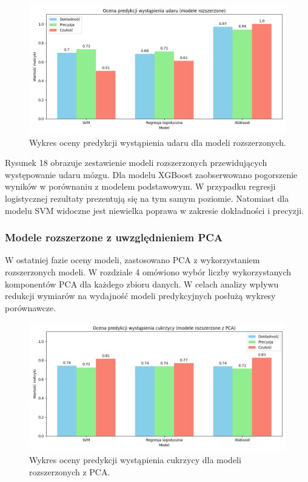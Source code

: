 \documentclass[onecolumn,12pt]{article}
\begin{document}
\begin{figure}[H]
    \centering
    \includegraphics[width=0.90\linewidth]{raport/graphs/udar_po.png}
    \captionsetup{justification=centering}
    \caption{Wykres oceny predykcji wystąpienia udaru dla modeli rozszerzonych.}
\end{figure}

\noindent
Rysunek 18 obrazuje zestawienie modeli rozszerzonych przewidujących występowanie udaru mózgu. Dla modelu XGBoost zaobserwowano pogorszenie wyników w porównaniu z modelem podstawowym. W przypadku regresji logistycznej rezultaty prezentują się na tym samym poziomie. Natomiast dla modelu SVM widoczne jest niewielka poprawa w zakresie dokładności i precyzji. 

\subsubsection{Modele rozszerzone z uwzględnieniem PCA}
\noindent
W ostatniej fazie oceny modeli, zastosowano PCA z wykorzystaniem rozszerzonych modeli. W rozdziale 4 omówiono wybór liczby wykorzystanych komponentów PCA dla każdego zbioru danych. W celach analizy wpływu redukcji wymiarów na wydajność modeli predykcyjnych posłużą wykresy porównawcze.

\begin{figure}[H]
    \centering
    \includegraphics[width=0.86\linewidth]{raport/graphs/cukrzyca_pca.png}
    \captionsetup{justification=centering}
    \caption{Wykres oceny predykcji wystąpienia cukrzycy dla modeli rozszerzonych z PCA.}
\end{figure}
\end{document}
